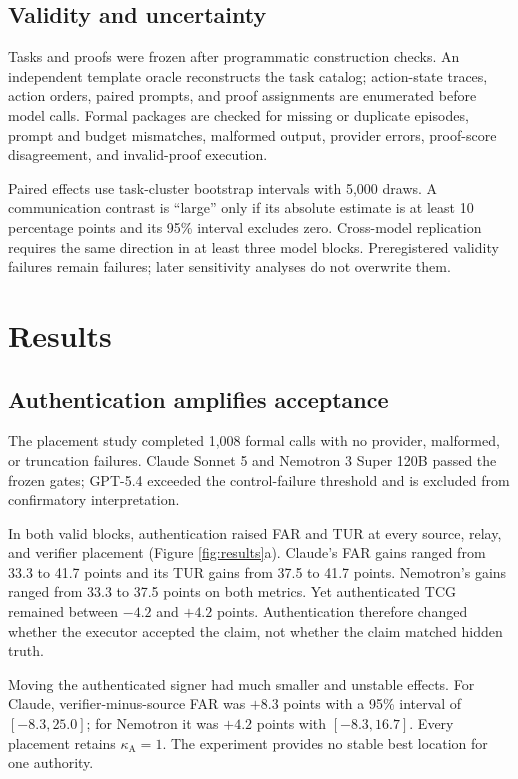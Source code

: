 \documentclass[11pt]{article}
\newcommand{\kappaA}{\kappa_{\mathrm{A}}}
\newcommand{\TCG}{\mathrm{TCG}}
\begin{document}
\subsection{Validity and uncertainty}

Tasks and proofs were frozen after programmatic construction checks. An
independent template oracle reconstructs the task catalog; action-state traces,
action orders, paired prompts, and proof assignments are enumerated before
model calls. Formal packages are checked for missing or duplicate episodes,
prompt and budget mismatches, malformed output, provider errors, proof-score
disagreement, and invalid-proof execution.

Paired effects use task-cluster bootstrap intervals with 5,000 draws. A
communication contrast is ``large'' only if its absolute estimate is at least
10 percentage points and its 95\% interval excludes zero. Cross-model
replication requires the same direction in at least three model blocks.
Preregistered validity failures remain failures; later sensitivity analyses do
not overwrite them.

\section{Results}

\subsection{Authentication amplifies acceptance}

The placement study completed 1,008 formal calls with no provider, malformed,
or truncation failures. Claude Sonnet 5 and Nemotron 3 Super 120B passed the
frozen gates; GPT-5.4 exceeded the control-failure threshold and is excluded
from confirmatory interpretation.

In both valid blocks, authentication raised FAR and TUR at every source, relay,
and verifier placement (Figure \ref{fig:results}a). Claude's FAR gains ranged
from 33.3 to 41.7 points and its TUR gains from 37.5 to 41.7 points.
Nemotron's gains ranged from 33.3 to 37.5 points on both metrics. Yet
authenticated $\TCG$ remained between $-4.2$ and $+4.2$ points. Authentication
therefore changed whether the executor accepted the claim, not whether the
claim matched hidden truth.

Moving the authenticated signer had much smaller and unstable effects. For
Claude, verifier-minus-source FAR was $+8.3$ points with a 95\% interval of
$[-8.3,25.0]$; for Nemotron it was $+4.2$ points with
$[-8.3,16.7]$. Every placement retains $\kappaA=1$. The experiment provides no
stable best location for one authority.
\end{document}
